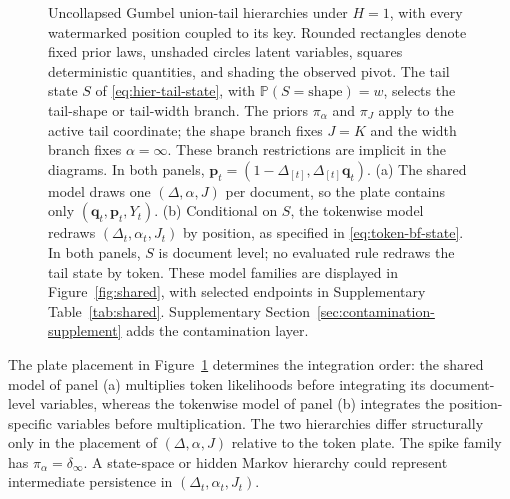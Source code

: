 \documentclass[11pt]{article}
\newcommand{\Prb}{\mathbb P}
\newcommand{\bP}{\bm p}
\begin{document}
\begin{figure}[t]
\begin{minipage}[t]{0.48\textwidth}
\end{minipage}

\caption{Uncollapsed Gumbel union-tail hierarchies under $H=1$, with every watermarked position coupled to its key.  Rounded rectangles denote fixed prior laws, unshaded circles latent variables, squares deterministic quantities, and shading the observed pivot.  The tail state $S$ of \eqref{eq:hier-tail-state}, with $\Prb(S=\mathrm{shape})=w$, selects the tail-shape or tail-width branch.  The priors $\pi_\alpha$ and $\pi_J$ apply to the active tail coordinate; the shape branch fixes $J=K$ and the width branch fixes $\alpha=\infty$.  These branch restrictions are implicit in the diagrams.  In both panels, $\bP_t=(1-\Delta_{[t]},\Delta_{[t]}\bm q_t)$.  (a) The shared model draws one $(\Delta,\alpha,J)$ per document, so the plate contains only $(\bm q_t,\bP_t,Y_t)$.  (b) Conditional on $S$, the tokenwise model redraws $(\Delta_t,\alpha_t,J_t)$ by position, as specified in \eqref{eq:token-bf-state}.  In both panels, $S$ is document level; no evaluated rule redraws the tail state by token.  These model families are displayed in Figure~\ref{fig:shared}, with selected endpoints in Supplementary Table~\ref{tab:shared}.  Supplementary Section~\ref{sec:contamination-supplement} adds the contamination layer.}
\label{fig:hierarchical-model}
\end{figure}

The plate placement in Figure~\ref{fig:hierarchical-model} determines the integration order: the shared model of panel (a) multiplies token likelihoods before integrating its document-level variables, whereas the tokenwise model of panel (b) integrates the position-specific variables before multiplication.  The two hierarchies differ structurally only in the placement of $(\Delta,\alpha,J)$ relative to the token plate.  The spike family has $\pi_\alpha=\delta_\infty$.  A state-space or hidden Markov hierarchy could represent intermediate persistence in $(\Delta_t,\alpha_t,J_t)$.
\end{document}
